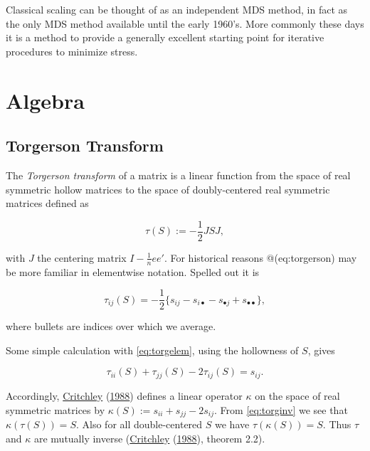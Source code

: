 \documentclass[
  12pt,
]{book}
\theoremstyle{definition}
\theoremstyle{definition}
\theoremstyle{definition}
\theoremstyle{definition}
\theoremstyle{remark}
\begin{document}
Classical scaling can be thought of as an independent MDS method, in fact as the only MDS method available until the early 1960's. More commonly these days it is a method to provide a generally excellent starting point for iterative procedures to minimize stress.

\hypertarget{algebra}{%
\section{Algebra}\label{algebra}}

\hypertarget{torgerson-transform}{%
\subsection{Torgerson Transform}\label{torgerson-transform}}

The \emph{Torgerson transform} of a matrix is a linear function from the
space of real symmetric hollow matrices to the space of doubly-centered
real symmetric matrices defined as

\begin{equation}
\tau(S):=-\frac12 JSJ,
\label{eq:torgerson}
\end{equation}

with \(J\) the centering matrix \(I-\frac{1}{n}ee'\). For historical reasons
@(eq:torgerson) may be more familiar in elementwise notation. Spelled
out it is

\begin{equation}
\tau_{ij}(S)=-\frac12\{s_{ij}-s_{i\bullet}-s_{\bullet j}+s_{\bullet\bullet}\},
\label{eq:torgelem}
\end{equation}

where bullets are indices over which we average.

Some simple calculation with \eqref{eq:torgelem}, using the hollowness of
\(S\), gives

\begin{equation}
\tau_{ii}(S)+\tau_{jj}(S)-2\tau_{ij}(S)=s_{ij}.
\label{eq:torginv}
\end{equation}

Accordingly, \protect\hyperlink{ref-critchley_88}{Critchley} (\protect\hyperlink{ref-critchley_88}{1988}) defines a linear operator \(\kappa\) on the
space of real symmetric matrices by \(\kappa(S):=s_{ii}+s_{jj}-2s_{ij}\).
From \eqref{eq:torginv} we see that \(\kappa(\tau(S))=S\). Also for all
double-centered \(S\) we have \(\tau(\kappa(S))=S\). Thus \(\tau\) and
\(\kappa\) are mutually inverse (\protect\hyperlink{ref-critchley_88}{Critchley} (\protect\hyperlink{ref-critchley_88}{1988}), theorem 2.2).
\end{document}
